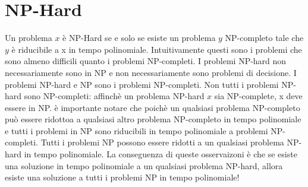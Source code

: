 \documentclass[12pt, a4paper, openany]{book}
\begin{document}
	\section{NP-Hard}
	Un problema $x$ è NP-Hard se e solo se esiste un problema $y$ NP-completo tale che $y$ è riducibile a x in tempo polinomiale.
	Intuitivamente questi sono i problemi che sono almeno difficili quanto i problemi NP-completi.
	I problemi NP-hard non necessariamente sono in NP e non necessariamente sono problemi di decisione.
	I problemi NP-hard e NP sono i problemi NP-completi.
	Non tutti i problemi NP-hard sono NP-completi: affinchè un problema NP-hard $x$ sia NP-complete, x deve essere in NP.
è importante notare che poichè un qualsiasi problema NP-completo può essere ridottoa a qualsiasi altro problema NP-completo in tempo polinomiale e tutti i problemi in NP sono riducibili in tempo polinomiale a problemi NP-completi.
Tutti i problemi NP possono essere ridotti a un qualsiasi problema NP-hard in tempo polinomiale.
La conseguenza di queste osservaizoni è che se esiste una soluzione in tempo polinomiale a un qualsiasi problema NP-hard, allora esiste una soluzione a tutti i problemi NP in tempo polinomiale!
\end{document}
